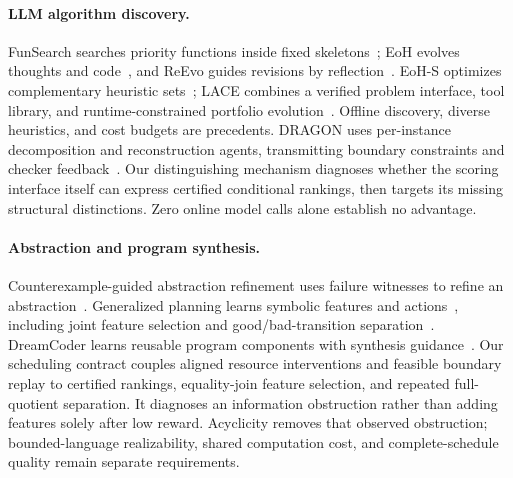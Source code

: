 \paragraph{LLM algorithm discovery.}
FunSearch searches priority functions inside fixed skeletons~\cite{romeraparedes2024funsearch};
EoH evolves thoughts and code~\cite{liu2024eoh}, and ReEvo guides revisions by
reflection~\cite{ye2024reevo}. EoH-S optimizes complementary heuristic
sets~\cite{liu2026eohs}; LACE combines a verified problem interface, tool library,
and runtime-constrained portfolio evolution~\cite{gong2026lace}.
Offline discovery, diverse heuristics, and cost budgets are precedents.
DRAGON uses per-instance decomposition and reconstruction agents, transmitting
boundary constraints and checker feedback~\cite{chen2026dragon}.
Our distinguishing mechanism diagnoses whether the scoring interface itself
can express certified conditional rankings, then targets its missing
structural distinctions. Zero online model calls alone establish no advantage.

\paragraph{Abstraction and program synthesis.}
Counterexample-guided abstraction refinement uses failure witnesses to refine
an abstraction~\cite{clarke2000cegar}. Generalized planning learns symbolic
features and actions~\cite{bonet2019features}, including joint feature selection
and good/bad-transition separation~\cite{frances2021policies}.
DreamCoder learns reusable program components with synthesis guidance~\cite{ellis2021dreamcoder}.
Our scheduling contract couples aligned resource interventions and feasible
boundary replay to certified rankings, equality-join feature selection, and
repeated full-quotient separation. It diagnoses an information obstruction
rather than adding features solely after low reward. Acyclicity removes that
observed obstruction; bounded-language realizability, shared computation cost,
and complete-schedule quality remain separate requirements.
